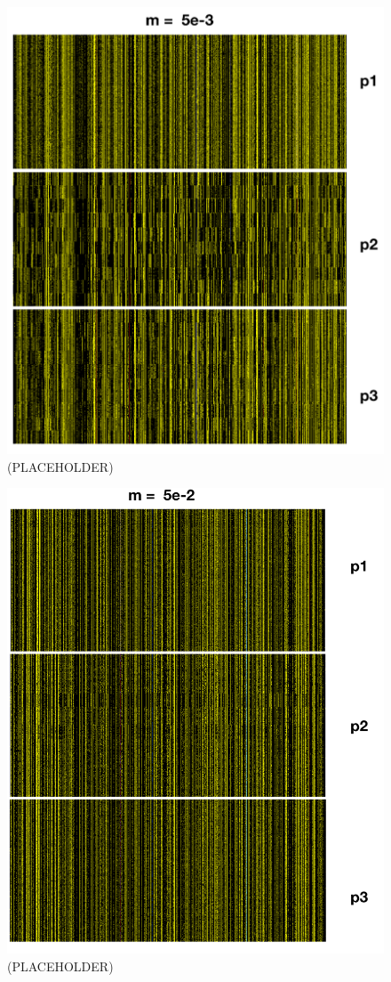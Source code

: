 \documentclass{article}
\begin{document}
\begin{figure}[h!tb]
	\begin{center}
  		\includegraphics[width=0.7\linewidth]{plotlyPlots/Haplo5e-3.png}
  		\caption{(PLACEHOLDER)
		}
  		\label{fig:Haplo3}
	\end{center}
\end{figure}

\begin{figure}[h!tb]
	\begin{center}
  		\includegraphics[width=0.7\linewidth]{plotlyPlots/Haplo5e-2.png}
  		\caption{(PLACEHOLDER)
		}
  		\label{fig:Haplo4}
	\end{center}
\end{figure}
\end{document}
